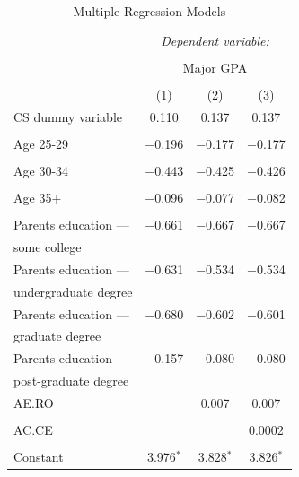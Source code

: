 \begin{table}[!htbp] \centering
  \caption{Multiple Regression Models}
  \label{tab:c-mr-models}
  \begin{tabular}{@{\extracolsep{5pt}}lccc}
    \toprule
     & \multicolumn{3}{c}{\textit{Dependent variable:}} \\
    \cline{2-4}
    \\[-1.8ex] & \multicolumn{3}{c}{Major GPA} \\
    \\[-1.8ex] & (1) & (2) & (3)\\
    \midrule
    CS dummy variable & 0.110 & 0.137 & 0.137 \\
    &  &  &  \\
    Age 25-29 & $-$0.196 & $-$0.177 & $-$0.177 \\
    &  &  &  \\
    Age 30-34 & $-$0.443 & $-$0.425 & $-$0.426 \\
    &  &  &  \\
    Age 35+ & $-$0.096 & $-$0.077 & $-$0.082 \\
    &  &  &  \\
    Parents education --- & $-$0.661 & $-$0.667 & $-$0.667 \\
    \hspace{2em}some college &  &  &  \\[+0.5em]
    Parents education --- & $-$0.631 & $-$0.534 & $-$0.534 \\
    \hspace{2em}undergraduate degree &  &  &  \\[+0.5em]
    Parents education --- & $-$0.680 & $-$0.602 & $-$0.601 \\
    \hspace{2em}graduate degree &  &  &  \\[+0.5em]
    Parents education --- & $-$0.157 & $-$0.080 & $-$0.080 \\
    \hspace{2em}post-graduate degree &  &  &  \\[+0.5em]
    AE.RO &  & 0.007 & 0.007 \\
    &  &  &  \\
    AC.CE &  &  & 0.0002 \\
    &  &  &  \\
    Constant & 3.976$^{*}$ & 3.828$^{*}$ & 3.826$^{*}$ \\

\end{tabular}
\end{table}
